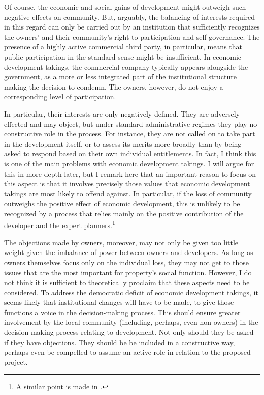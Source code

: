 \documentclass[12pt,a4paper]{book} %
\begin{document}
Of course, the economic and social gains of development might outweigh such negative effects on community. But, arguably, the balancing of interests required in this regard can only be carried out by an institution that sufficiently recognizes the owners' and their community's right to participation and self-governance. The presence of a highly active commercial third party, in particular, means that public participation in the standard sense might be insufficient. In economic development takings, the commercial company typically appears alongside the government, as a more or less integrated part of the institutional structure making the decision to condemn. The owners, however, do not enjoy a corresponding level of participation.

In particular, their interests are only negatively defined. They are adversely effected and may object, but under standard administrative regimes they play no constructive role in the process. For instance, they are not called on to take part in the development itself, or to assess its merits more broadly than by being asked to respond based on their own individual entitlements. In fact, I think this is one of the main problems with economic development takings. I will argue for this in more depth later, but I remark here that an important reason to focus on this aspect is that it involves precisely those values that economic development takings are most likely to offend against. In particular, if the loss of community outweighs the positive effect of economic development, this is unlikely to be recognized by a process that relies mainly on the positive contribution of the developer and the expert planners.\footnote{A similar point is made in \cite{underkuffler06}.} 

The objections made by owners, moreover, may not only be given too little weight given the imbalance of power between owners and developers. As long as owners themselves focus only on the individual loss, they may not get to those issues that are the most important for property's social function. However, I do not think it is sufficient to theoretically proclaim that these aspects need to be considered. To address the democratic deficit of economic development takings, it seems likely that institutional changes will have to be made, to give those functions a voice in the decision-making process. This should ensure greater involvement by the local community (including, perhaps, even non-owners) in the decision-making process relating to development. Not only should they be asked if they have objections. They should be be included in a constructive way, perhaps even be compelled to assume an active role in relation to the proposed project.
\end{document}

